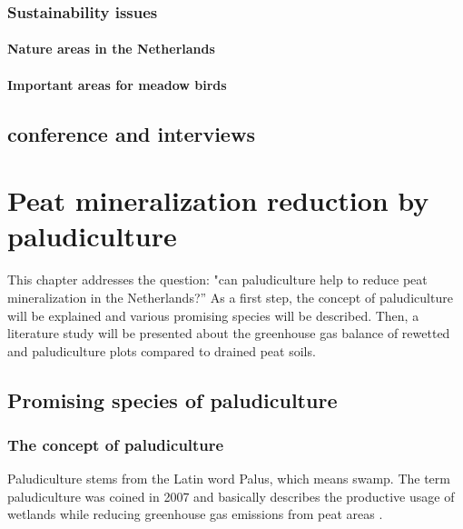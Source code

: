 \documentclass[a4paper,12pt]{scrbook}
\begin{document}
\subsection{Sustainability issues}

\subsubsection{Nature areas in the Netherlands}

\subsubsection{Important areas for meadow birds}


\section{conference and interviews}

\chapter{Peat mineralization reduction by paludiculture}

This chapter addresses the question: "can paludiculture help to reduce peat mineralization in the Netherlands?” As a first step, the concept of paludiculture will be explained and various promising species will be described. Then, a literature study will be presented about the greenhouse gas balance of rewetted and paludiculture plots compared to drained peat soils.

\section{Promising species of paludiculture}

\subsection{The concept of paludiculture}

Paludiculture stems from the Latin word Palus, which means swamp. The term paludiculture was coined in 2007 and basically describes the productive usage of wetlands while reducing greenhouse gas emissions from peat areas \citep{wichtmann2007paludiculture}. %
\end{document}
